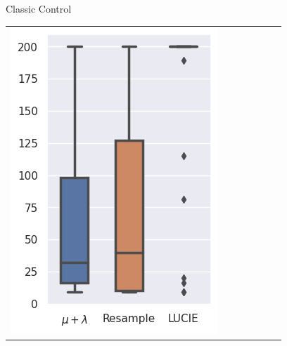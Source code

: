 \begin{frame}{\tcv{} Classic Control}
\begin{table}
\begin{tabular}{ccccccc}
                \includegraphics[width=\figwidth]{images/LUCIE/cartpole/boxplot_cartpole_800.png}\\
            \end{tabular}
        \end{table}

        \vspace{-1em}


\end{frame}
